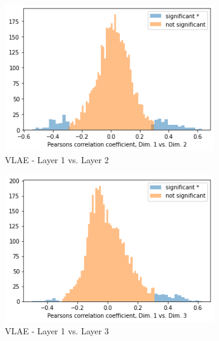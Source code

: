\begin{figure}
    \centering
    \begin{subfigure}{.3\textwidth}
        \includegraphics[width=\textwidth]{images/notprop/dsprites/vlae/dim_1_2.png}
        \caption{\ac{VLAE} - Layer 1 vs. Layer 2}
    \end{subfigure}
    \hfill
    \begin{subfigure}{.3\textwidth}
        \includegraphics[width=\textwidth]{images/notprop/dsprites/vlae/dim_1_3.png}
        \caption{\ac{VLAE} - Layer 1 vs. Layer 3}
    \end{subfigure}
    \hfill
    \begin{subfigure}{.3\textwidth}

\end{subfigure}
\end{figure}
